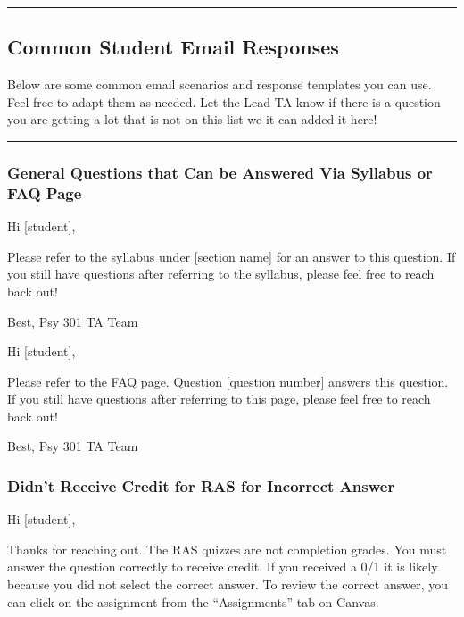 \documentclass[
]{article}
\begin{document}
\begin{center}\rule{0.5\linewidth}{0.5pt}\end{center}

\hypertarget{common-student-email-responses}{%
\subsection{Common Student Email Responses}\label{common-student-email-responses}}

Below are some common email scenarios and response templates you can use. Feel free to adapt them as needed. Let the Lead TA know if there is a question you are getting a lot that is not on this list we it can added it here!

\begin{center}\rule{0.5\linewidth}{0.5pt}\end{center}

\hypertarget{general-questions-that-can-be-answered-via-syllabus-or-faq-page}{%
\subsubsection{General Questions that Can be Answered Via Syllabus or FAQ Page}\label{general-questions-that-can-be-answered-via-syllabus-or-faq-page}}

Hi {[}student{]},

Please refer to the syllabus under {[}section name{]} for an answer to this question. If you still have questions after referring to the syllabus, please feel free to reach back out!

Best,
Psy 301 TA Team

Hi {[}student{]},

Please refer to the FAQ page. Question {[}question number{]} answers this question. If you still have questions after referring to this page, please feel free to reach back out!

Best,
Psy 301 TA Team

\hypertarget{didnt-receive-credit-for-ras-for-incorrect-answer}{%
\subsubsection{Didn't Receive Credit for RAS for Incorrect Answer}\label{didnt-receive-credit-for-ras-for-incorrect-answer}}

Hi {[}student{]},

Thanks for reaching out. The RAS quizzes are not completion grades. You must answer the question correctly to receive credit. If you received a 0/1 it is likely because you did not select the correct answer. To review the correct answer, you can click on the assignment from the ``Assignments'' tab on Canvas.
\end{document}
